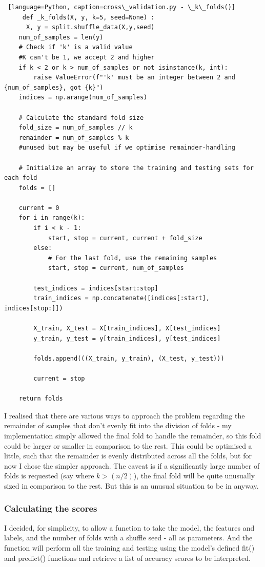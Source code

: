 \documentclass[letterpaper,10pt]{article}
\begin{document}
\begin{lstlisting} [language=Python, caption=cross\_validation.py - \_k\_folds()]
     def _k_folds(X, y, k=5, seed=None) :
      X, y = split.shuffle_data(X,y,seed)
    num_of_samples = len(y)
    # Check if 'k' is a valid value
    #K can't be 1, we accept 2 and higher
    if k < 2 or k > num_of_samples or not isinstance(k, int):
        raise ValueError(f"'k' must be an integer between 2 and {num_of_samples}, got {k}")
    indices = np.arange(num_of_samples)

    # Calculate the standard fold size
    fold_size = num_of_samples // k
    remainder = num_of_samples % k
    #unused but may be useful if we optimise remainder-handling

    # Initialize an array to store the training and testing sets for each fold
    folds = []

    current = 0
    for i in range(k):
        if i < k - 1:
            start, stop = current, current + fold_size
        else:
            # For the last fold, use the remaining samples
            start, stop = current, num_of_samples

        test_indices = indices[start:stop]
        train_indices = np.concatenate([indices[:start], indices[stop:]])

        X_train, X_test = X[train_indices], X[test_indices]
        y_train, y_test = y[train_indices], y[test_indices]

        folds.append(((X_train, y_train), (X_test, y_test)))

        current = stop

    return folds
\end{lstlisting}
I realised that there are various ways to approach the problem regarding the remainder of samples that don't evenly fit into the division of folds - my implementation simply allowed the final fold to handle the remainder, so this fold could be larger or smaller in comparison to the rest. This could be optimised a little, such that the remainder is evenly distributed across all the folds, but for now I chose the simpler approach. The caveat is if a significantly large number of folds is requested (say where \(k > (n/2)\)), the final fold will be quite unusually sized in comparison to the rest. But this is an unusual situation to be in anyway. \par

\subsubsection{Calculating the scores}
I decided, for simplicity, to allow a function to take the model, the features and labels, and the number of folds with a shuffle seed - all as parameters. And the function will perform all the training and testing using the model's defined fit() and predict() functions and retrieve a list of accuracy scores to be interpreted. 
\end{document}
